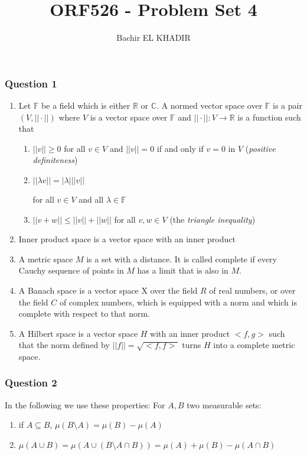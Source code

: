 \documentclass[12pt]{article}
\title{ORF526 - Problem Set 4}
\author{Bachir EL KHADIR }
\newcommand{\Q}[1]{\subsubsection*{Question #1}}
\newcommand{\union}[1]{\underset{#1}{\cup} }
\newcommand{\inter}[1]{\underset{#1}{\cap} }
\newcommand{\norm}[1]{||{#1}|| }
\newcommand{\abs}[1]{|{#1}| }
\begin{document}
\maketitle

\Q{1}
\begin{enumerate}

\item
Let $\mathbb{F}$ be a field which is either $\mathbb{R}$ or $\mathbb{C}$.  A normed vector space over $\mathbb{F}$ is a pair $(V,\norm{\cdot})$ where $V$ is a vector space over $\mathbb{F}$ and $\norm{\cdot}\colon V\to\mathbb{R}$ is a function such that
\begin{enumerate}
\item $\norm{v}\geq 0$ for all $v\in V$ and $\norm{v}=0$ if and only if $v=0$ in $V$ (\emph{positive definiteness})
\item $\norm{\lambda v} = \abs{\lambda} \norm{v}$ 

for all $v\in V$ and all $\lambda\in\mathbb{F}$
\item $\norm{v+w}\leq\norm{v}+\norm{w}$ for all $v,w\in V$ (the \emph{triangle inequality})
\end{enumerate}


\item Inner product space is a vector space with an inner product

\item A metric space $M$ is a set with a distance.
It is called complete if every Cauchy sequence of points in $M$ has a limit that is also in $M$.

\item A Banach space is a vector space X over the field $R$ of real numbers, or over the field $C$ of complex numbers, which is equipped with a norm and which is complete with respect to that norm.

\item A Hilbert space is a vector space $H$ with an inner product $<f,g>$ such that the norm defined by
 $\norm{f}=\sqrt{<f,f>}$
turns $H$ into a complete metric space. 
\end{enumerate}

\Q{2}

In the following we use these properties: For $A, B$ two measurable sets:

\begin{enumerate}
\item if $A \subseteq B$, $\mu(B \setminus A) = \mu(B) - \mu(A)$
\item $\mu(A \union{} B) = \mu(A \union{} (B \setminus A \inter{}B)) = \mu(A) + \mu(B) - \mu(A \inter{} B)$
\end{enumerate}
\end{document}
